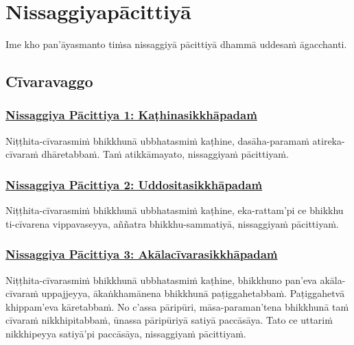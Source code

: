 \section{Nissaggiyapācittiyā}
\label{np}

\begin{intro}
  Ime kho pan'āyasmanto tiṁsa nissaggiyā pācittiyā dhammā uddesaṁ āgacchanti.
\end{intro}

\setsubsecheadstyle{\subsectionFmt}
\subsection{Cīvaravaggo}
\vspace{0.2cm}

\subsubsection*{\hyperref[forf-exp1]{Nissaggiya Pācittiya 1: Kaṭhinasikkhāpadaṁ}}
\label{np1}

Niṭṭhita-cīvarasmiṁ bhikkhunā ubbhatasmiṁ kaṭhine, dasāha-paramaṁ atireka-cīvaraṁ dhāretabbaṁ. Taṁ atikkāmayato, nissaggiyaṁ pācittiyaṁ.

\subsubsection*{\hyperref[forf-exp2]{Nissaggiya Pācittiya 2: Uddositasikkhāpadaṁ}}
\label{np2}

Niṭṭhita-cīvarasmiṁ bhikkhunā ubbhatasmiṁ kaṭhine, eka-rattam'pi ce bhikkhu ti-cīvarena vippavaseyya, aññatra bhikkhu-sammatiyā, nissaggiyaṁ pācittiyaṁ.

\subsubsection*{\hyperref[forf-exp3]{Nissaggiya Pācittiya 3: Akālacīvarasikkhāpadaṁ}}
\label{np3}

Niṭṭhita-cīvarasmiṁ bhikkhunā ubbhatasmiṁ kaṭhine, bhikkhuno pan'eva akāla-cīvaraṁ uppajjeyya, ākaṅkhamānena bhikkhunā paṭiggahetabbaṁ. Paṭiggahetvā khippam'eva kāretabbaṁ. No c'assa pāripūri, māsa-paraman'tena bhikkhunā taṁ cīvaraṁ nikkhipitabbaṁ, ūnassa pāripūriyā satiyā paccāsāya. Tato ce uttariṁ nikkhipeyya satiyā'pi paccāsāya, nissaggiyaṁ pācittiyaṁ.


